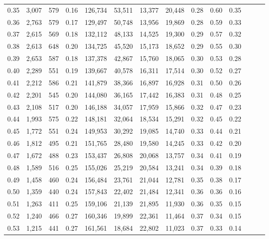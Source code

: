 \begin{tabular}{rrrrrrrrrrrrrr}
0.35 &  3,007 &  579 &  0.16 &  126,734 &   53,511 &  13,377 &  20,448 &  0.28 &  0.60 &      0.35 \\
0.36 &  2,763 &  579 &  0.17 &  129,497 &   50,748 &  13,956 &  19,869 &  0.28 &  0.59 &      0.33 \\
0.37 &  2,615 &  569 &  0.18 &  132,112 &   48,133 &  14,525 &  19,300 &  0.29 &  0.57 &      0.32 \\
0.38 &  2,613 &  648 &  0.20 &  134,725 &   45,520 &  15,173 &  18,652 &  0.29 &  0.55 &      0.30 \\
0.39 &  2,653 &  587 &  0.18 &  137,378 &   42,867 &  15,760 &  18,065 &  0.30 &  0.53 &      0.28 \\
0.40 &  2,289 &  551 &  0.19 &  139,667 &   40,578 &  16,311 &  17,514 &  0.30 &  0.52 &      0.27 \\
0.41 &  2,212 &  586 &  0.21 &  141,879 &   38,366 &  16,897 &  16,928 &  0.31 &  0.50 &      0.26 \\
0.42 &  2,201 &  545 &  0.20 &  144,080 &   36,165 &  17,442 &  16,383 &  0.31 &  0.48 &      0.25 \\
0.43 &  2,108 &  517 &  0.20 &  146,188 &   34,057 &  17,959 &  15,866 &  0.32 &  0.47 &      0.23 \\
0.44 &  1,993 &  575 &  0.22 &  148,181 &   32,064 &  18,534 &  15,291 &  0.32 &  0.45 &      0.22 \\
0.45 &  1,772 &  551 &  0.24 &  149,953 &   30,292 &  19,085 &  14,740 &  0.33 &  0.44 &      0.21 \\
0.46 &  1,812 &  495 &  0.21 &  151,765 &   28,480 &  19,580 &  14,245 &  0.33 &  0.42 &      0.20 \\
0.47 &  1,672 &  488 &  0.23 &  153,437 &   26,808 &  20,068 &  13,757 &  0.34 &  0.41 &      0.19 \\
0.48 &  1,589 &  516 &  0.25 &  155,026 &   25,219 &  20,584 &  13,241 &  0.34 &  0.39 &      0.18 \\
0.49 &  1,458 &  460 &  0.24 &  156,484 &   23,761 &  21,044 &  12,781 &  0.35 &  0.38 &      0.17 \\
0.50 &  1,359 &  440 &  0.24 &  157,843 &   22,402 &  21,484 &  12,341 &  0.36 &  0.36 &      0.16 \\
0.51 &  1,263 &  411 &  0.25 &  159,106 &   21,139 &  21,895 &  11,930 &  0.36 &  0.35 &      0.15 \\
0.52 &  1,240 &  466 &  0.27 &  160,346 &   19,899 &  22,361 &  11,464 &  0.37 &  0.34 &      0.15 \\
0.53 &  1,215 &  441 &  0.27 &  161,561 &   18,684 &  22,802 &  11,023 &  0.37 &  0.33 &      0.14 \\

\end{tabular}
